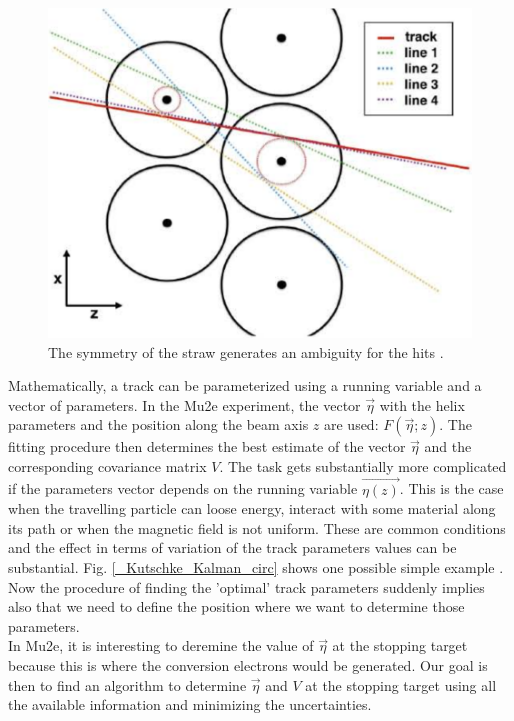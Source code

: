 \documentclass[12pt,a4paper,openright, oneside, titlepage]{book} %
\begin{document}
\begin{figure}[h!]
\centering
\includegraphics[scale=0.5]{giani_PatRec_ambiguity}
\caption[Hit ambiguity in a straw tube]{The symmetry of the straw generates an ambiguity for the hits \cite{GianiPatRec:2020}.}
\label{_ambiguity}
\end{figure}

\noindent Mathematically, a track can be parameterized using a running variable and a vector of parameters. 
In the Mu2e experiment, the vector $\vec{\eta}$ with the helix parameters and the position along the beam axis $z$ are used: $F(\vec{\eta};z)$. 
The fitting procedure then determines the best estimate of the vector $\vec{\eta}$ and the corresponding covariance matrix $V$. 
The task gets substantially more complicated if the parameters vector depends on the running variable $\vec{\eta(z)}$. 
This is the case when the travelling particle can loose energy, interact with some material along its path or when the magnetic field is not uniform. 
These are common conditions and the effect in terms of variation of the track parameters values can be substantial.
Fig. \ref{_Kutschke_Kalman_circ} shows one possible simple example \cite{Kutschke}.
Now the procedure of finding the 'optimal' track parameters suddenly implies also that we need to define the position where we want to determine those parameters.\\
In Mu2e, it is interesting to deremine the value of $\vec{\eta}$ at the stopping target because this is where the conversion electrons would be generated. 
Our goal is then to find an algorithm to determine $\vec{\eta}$ and $V$ at the stopping target using all the available information and minimizing the uncertainties.\\
\end{document}
